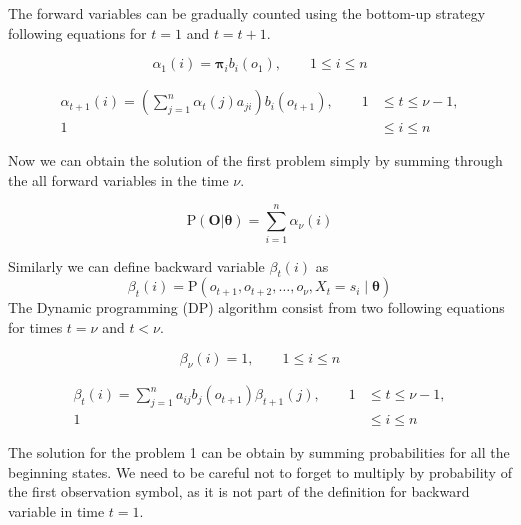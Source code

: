 \documentclass[thesis=M,english]{FITthesis}[2012/10/20]
\newcommand{\matr}[1]{\mathbf{#1}}
\begin{document}
The forward variables can be gradually counted using the bottom-up strategy following equations for $t=1$ and $t=t+1$.

\begin{equation}
\alpha_1(i) = \boldsymbol\pi_i b_i(o_1), \qquad 1 \leq i \leq n
\end{equation}

\begin{equation}
\begin{aligned}
\alpha_{t+1}(i) = \left( \sum_{j=1}^n \alpha_t(j) a_{ji} \right) b_i(o_{t+1}), \qquad 1& \leq t \leq \nu - 1, \\ 
                                                                                 1& \leq i \leq n		\end{aligned}
\end{equation}

Now we can obtain the solution of the first problem simply by summing through the all forward variables in the time $\nu$.

\begin{equation}
\mathrm{P}(\matr{O}|\boldsymbol{\theta}) = \sum_{i=1}^n \alpha_{\nu}(i)
\end{equation} 

Similarly we can define backward variable $\beta_t(i)$ as
\begin{equation}
\beta_t(i) = \mathrm{P}(o_{t+1},o_{t+2},\dots,o_{\nu},X_t = s_i \mid \boldsymbol{\theta} ) 
\end{equation}
The Dynamic programming (DP) algorithm consist from two following equations for times $t = \nu$ and $t < \nu$. 

\begin{equation}
\beta_{\nu}(i) = 1, \qquad 1 \leq i \leq n
\end{equation}

\begin{equation}
\begin{aligned}
\beta_{t}(i) = \sum_{j=1}^n a_{ij} b_j(o_{t+1}) \beta_{t+1}(j), \qquad 1& \leq t \leq \nu - 1, \\ 
                                                                                 1& \leq i \leq n		\end{aligned}
\end{equation}

The solution for the problem 1 can be obtain by summing probabilities for all the beginning states. We need to be careful not to forget to multiply by probability of the first observation symbol, as it is not part of the definition for backward variable in time $t=1$.
\end{document}
